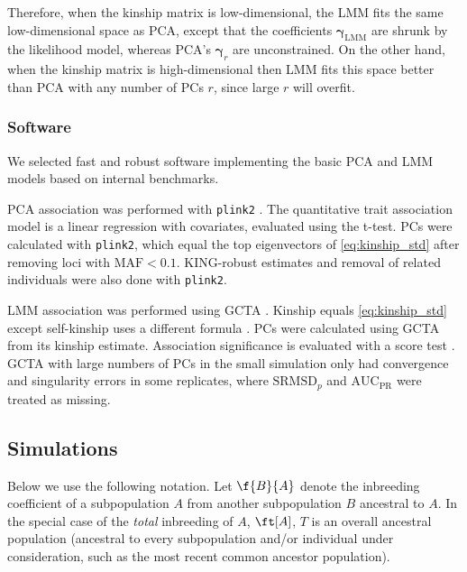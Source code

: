 \documentclass[11pt]{article}
\newcommand{\rmsd}{\text{SRMSD}_p}
\newcommand{\auc}{\text{AUC}_\text{PR}}
\begin{document}
Therefore, when the kinship matrix is low-dimensional, the LMM fits the same low-dimensional space as PCA, except that the coefficients $\boldsymbol{\gamma}_\text{LMM}$ are shrunk by the likelihood model, whereas PCA's $\boldsymbol{\gamma}_r$ are unconstrained.
On the other hand, when the kinship matrix is high-dimensional then LMM fits this space better than PCA with any number of PCs $r$, since large $r$ will overfit.

\subsubsection{Software}

We selected fast and robust software implementing the basic PCA and LMM models based on internal benchmarks.

PCA association was performed with \texttt{plink2} \citep{chang_second-generation_2015}.
The quantitative trait association model is a linear regression with covariates, evaluated using the t-test.
PCs were calculated with \texttt{plink2}, which equal the top eigenvectors of \cref{eq:kinship_std} after removing loci with $\text{MAF} < 0.1$.
KING-robust estimates and removal of related individuals were also done with \texttt{plink2}.

LMM association was performed using GCTA \citep{yang_gcta:_2011}.
Kinship equals \cref{eq:kinship_std} except self-kinship uses a different formula \citep{yang_gcta:_2011}.
PCs were calculated using GCTA from its kinship estimate.
Association significance is evaluated with a score test \citep{yang_advantages_2014}.
GCTA with large numbers of PCs in the small simulation only had convergence and singularity errors in some replicates, where $\rmsd$ and $\auc$ were treated as missing.

\subsection{Simulations}

Below we use the following notation.
Let $\f{B}{A}$ denote the inbreeding coefficient of a subpopulation $A$ from another subpopulation $B$ ancestral to $A$.
In the special case of the \textit{total} inbreeding of $A$, $\ft[A]$, $T$ is an overall ancestral population (ancestral to every subpopulation and/or individual under consideration, such as the most recent common ancestor population).
\end{document}

